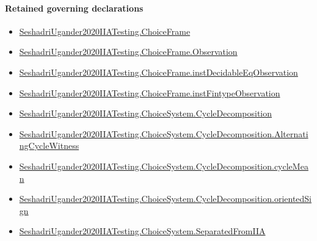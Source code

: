 \documentclass[10pt]{article}
\begin{document}
\paragraph{Retained governing declarations}
\begin{itemize}\raggedright
\item \hyperlink{paper-prerequisite-0b24d39c6f4d1898}{Seshadri\allowbreak{}Ugander2020\allowbreak{}IIA\allowbreak{}Testing.\allowbreak{}Choice\allowbreak{}Frame}
\item \hyperlink{paper-prerequisite-d450557e9618e377}{Seshadri\allowbreak{}Ugander2020\allowbreak{}IIA\allowbreak{}Testing.\allowbreak{}Choice\allowbreak{}Frame.\allowbreak{}Observation}
\item \hyperlink{governing-declaration-ad61eb0534c5ba6e}{Seshadri\allowbreak{}Ugander2020\allowbreak{}IIA\allowbreak{}Testing.\allowbreak{}Choice\allowbreak{}Frame.\allowbreak{}inst\allowbreak{}Decidable\allowbreak{}Eq\allowbreak{}Observation}
\item \hyperlink{governing-declaration-a7119ec24e922f45}{Seshadri\allowbreak{}Ugander2020\allowbreak{}IIA\allowbreak{}Testing.\allowbreak{}Choice\allowbreak{}Frame.\allowbreak{}inst\allowbreak{}Fintype\allowbreak{}Observation}
\item \hyperlink{paper-prerequisite-7ec2ce004f72e29f}{Seshadri\allowbreak{}Ugander2020\allowbreak{}IIA\allowbreak{}Testing.\allowbreak{}Choice\allowbreak{}System.\allowbreak{}Cycle\allowbreak{}Decomposition}
\item \hyperlink{paper-prerequisite-7c17e7188aae79a0}{Seshadri\allowbreak{}Ugander2020\allowbreak{}IIA\allowbreak{}Testing.\allowbreak{}Choice\allowbreak{}System.\allowbreak{}Cycle\allowbreak{}Decomposition.\allowbreak{}Alternating\allowbreak{}Cycle\allowbreak{}Witness}
\item \hyperlink{paper-prerequisite-4f9c0f894e80708f}{Seshadri\allowbreak{}Ugander2020\allowbreak{}IIA\allowbreak{}Testing.\allowbreak{}Choice\allowbreak{}System.\allowbreak{}Cycle\allowbreak{}Decomposition.\allowbreak{}cycle\allowbreak{}Mean}
\item \hyperlink{governing-declaration-68ca32269bc85500}{Seshadri\allowbreak{}Ugander2020\allowbreak{}IIA\allowbreak{}Testing.\allowbreak{}Choice\allowbreak{}System.\allowbreak{}Cycle\allowbreak{}Decomposition.\allowbreak{}oriented\allowbreak{}Sign}
\item \hyperlink{paper-prerequisite-9511f5d19b7856b5}{Seshadri\allowbreak{}Ugander2020\allowbreak{}IIA\allowbreak{}Testing.\allowbreak{}Choice\allowbreak{}System.\allowbreak{}Separated\allowbreak{}From\allowbreak{}IIA}

\end{itemize}
\end{document}
